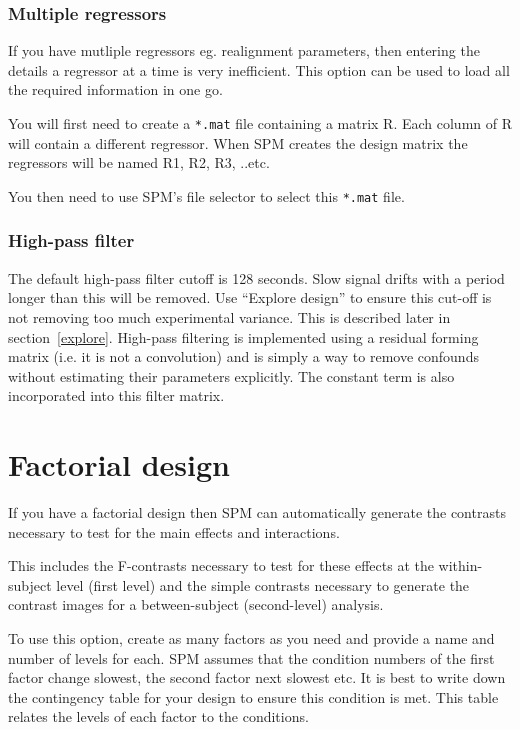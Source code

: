 \subsubsection{Multiple regressors}

If you have mutliple regressors eg. realignment parameters, then entering the details a regressor at a time is very inefficient. This option can be used to load all the required information in one go. 

You will first need to create a \verb!*.mat! file containing a matrix R. Each column of R will contain a different regressor. When SPM creates the design matrix the regressors will be named R1, R2, R3, ..etc.

You then need to use SPM's file selector to select this \verb!*.mat! file.

\subsubsection{High-pass filter}

The default high-pass filter cutoff is 128 seconds. Slow signal drifts with a period longer than this will be removed. Use ``Explore design'' to ensure this cut-off is not removing too much experimental variance. This is described later in section~\ref{explore}. High-pass filtering is implemented using a residual forming matrix (i.e. it is not a convolution) and is simply a way to remove confounds without estimating their parameters explicitly.  The constant term is also incorporated into this filter matrix.

\section{Factorial design}

If you have a factorial design then SPM can automatically generate the contrasts necessary to test for the main effects and interactions.

This includes the F-contrasts necessary to test for these effects at the within-subject level (first level) and the simple contrasts necessary to generate the contrast images for a between-subject (second-level) analysis.

To use this option, create as many factors as you need and provide a name and number of levels for each.  SPM assumes that the condition numbers of the first factor change slowest, the second factor next slowest etc. It is best to write down the contingency table for your design to ensure this condition is met. This table relates the levels of each factor to the conditions.

